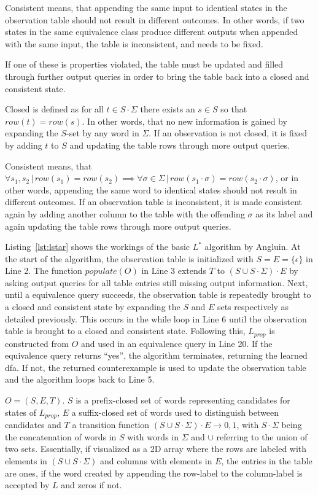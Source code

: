 Consistent means, that appending the same input to identical states in the observation table should not result in different outcomes. In other words, if two states in the same equivalence class produce different outputs when appended with the same input, the table is inconsistent, and needs to be fixed.

If one of these is properties violated, the table must be updated and filled through further output queries in order to bring the table back into a closed and consistent state. 

\iffalse
Closed is defined as for all $t \in S \cdot \Sigma$ there exists an $s \in S$ so that $row(t) = row(s)$. In other words, that no new information is gained by expanding the $S$-set by any word in $\Sigma$. If an observation is not closed, it is fixed by adding $t$ to $S$ and updating the table rows through more output queries. 

Consistent means, that $\forall s_1, s_2 \,|\, row(s_1) = row(s_2) \implies \forall \sigma \in \Sigma \,|\, row(s_1 \cdot \sigma) = row(s_2 \cdot \sigma)$, or in other words, appending the same word to identical states should not result in different outcomes. If an observation table is inconsistent, it is made consistent again by adding another column to the table with the offending $\sigma$ as its label and again updating the table rows through more output queries. 


Listing~\ref{lst:lstar} shows the workings of the basic $L^*$ algorithm by Angluin. At the start of the algorithm, the observation table is initialized with $S = E = \{\epsilon\}$ in Line 2. The function $populate(O)$ in Line 3 extends $T$ to $(S \cup S \cdot \Sigma) \cdot E$ by asking output queries for all table entries still missing output information. Next, until a equivalence query succeeds, the observation table is repeatedly brought to a closed and consistent state by expanding the $S$ and $E$ sets respectively as detailed previously. This occurs in the while loop in Line 6 until the observation table is brought to a closed and consistent state. Following this, $L_{prop}$ is constructed from $O$ and used in an equivalence query in Line 20. If the equivalence query returns ``yes'', the algorithm terminates, returning the learned \ac{dfa}. If not, the returned counterexample is used to update the observation table and the algorithm loops back to Line 5. 


$O = (S,E,T)$. $S$ is a prefix-closed set of words representing candidates for states of $L_{prop}$, $E$ a suffix-closed set of words used to distinguish between candidates and $T$ a transition function $(S \cup S \cdot \Sigma) \cdot E \rightarrow {0,1}$, with $S \cdot \Sigma$ being the concatenation of words in $S$ with words in $\Sigma$ and $\cup$ referring to the union of two sets. Essentially, if visualized as a 2D array where the rows are labeled with elements in $(S \cup S \cdot \Sigma)$ and columns with elements in $E$, the entries in the table are ones, if the word created by appending the row-label to the column-label is accepted by $L$ and zeros if not. 

